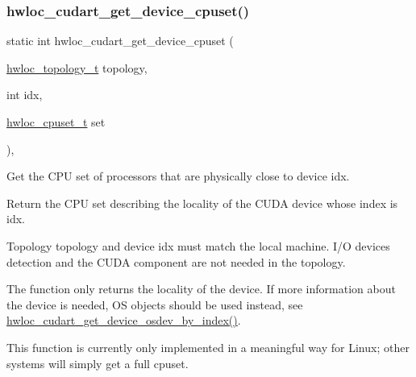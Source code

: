 \subsubsection{\texorpdfstring{hwloc\+\_\+cudart\+\_\+get\+\_\+device\+\_\+cpuset()}{hwloc\_cudart\_get\_device\_cpuset()}}
{\footnotesize\ttfamily static int hwloc\+\_\+cudart\+\_\+get\+\_\+device\+\_\+cpuset (\begin{DoxyParamCaption}\item[{\hyperlink{a00186_ga9d1e76ee15a7dee158b786c30b6a6e38}{hwloc\+\_\+topology\+\_\+t}}]{topology,  }\item[{int}]{idx,  }\item[{\hyperlink{a00183_ga4bbf39b68b6f568fb92739e7c0ea7801}{hwloc\+\_\+cpuset\+\_\+t}}]{set }\end{DoxyParamCaption})\hspace{0.3cm}{\ttfamily [inline]}, {\ttfamily [static]}}



Get the C\+PU set of processors that are physically close to device {\ttfamily idx}. 

Return the C\+PU set describing the locality of the C\+U\+DA device whose index is {\ttfamily idx}.

Topology {\ttfamily topology} and device {\ttfamily idx} must match the local machine. I/O devices detection and the C\+U\+DA component are not needed in the topology.

The function only returns the locality of the device. If more information about the device is needed, OS objects should be used instead, see \hyperlink{a00220_gac0f3eeaf7712919f298097b1a21307b0}{hwloc\+\_\+cudart\+\_\+get\+\_\+device\+\_\+osdev\+\_\+by\+\_\+index()}.

This function is currently only implemented in a meaningful way for Linux; other systems will simply get a full cpuset. \mbox{\label{a00220_gac0f3eeaf7712919f298097b1a21307b0}} 
